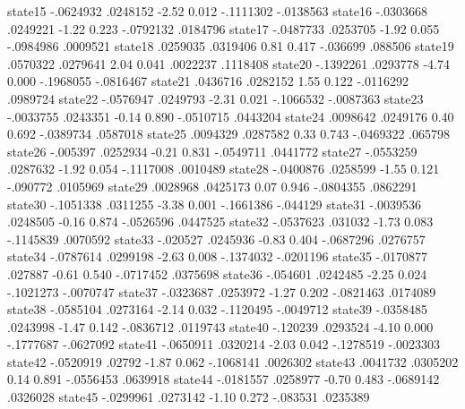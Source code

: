      state15 {\VBAR}  -.0624932   .0248152    -2.52   0.012    -.1111302   -.0138563
     state16 {\VBAR}  -.0303668   .0249221    -1.22   0.223    -.0792132    .0184796
     state17 {\VBAR}  -.0487733   .0253705    -1.92   0.055    -.0984986    .0009521
     state18 {\VBAR}   .0259035   .0319406     0.81   0.417     -.036699     .088506
     state19 {\VBAR}   .0570322   .0279641     2.04   0.041     .0022237    .1118408
     state20 {\VBAR}  -.1392261   .0293778    -4.74   0.000    -.1968055   -.0816467
     state21 {\VBAR}   .0436716   .0282152     1.55   0.122    -.0116292    .0989724
     state22 {\VBAR}  -.0576947   .0249793    -2.31   0.021    -.1066532   -.0087363
     state23 {\VBAR}  -.0033755   .0243351    -0.14   0.890    -.0510715    .0443204
     state24 {\VBAR}   .0098642   .0249176     0.40   0.692    -.0389734    .0587018
     state25 {\VBAR}   .0094329   .0287582     0.33   0.743    -.0469322     .065798
     state26 {\VBAR}   -.005397   .0252934    -0.21   0.831    -.0549711    .0441772
     state27 {\VBAR}  -.0553259   .0287632    -1.92   0.054    -.1117008    .0010489
     state28 {\VBAR}  -.0400876   .0258599    -1.55   0.121     -.090772    .0105969
     state29 {\VBAR}   .0028968   .0425173     0.07   0.946    -.0804355    .0862291
     state30 {\VBAR}  -.1051338   .0311255    -3.38   0.001    -.1661386    -.044129
     state31 {\VBAR}  -.0039536   .0248505    -0.16   0.874    -.0526596    .0447525
     state32 {\VBAR}  -.0537623    .031032    -1.73   0.083    -.1145839    .0070592
     state33 {\VBAR}   -.020527   .0245936    -0.83   0.404    -.0687296    .0276757
     state34 {\VBAR}  -.0787614   .0299198    -2.63   0.008    -.1374032   -.0201196
     state35 {\VBAR}  -.0170877    .027887    -0.61   0.540    -.0717452    .0375698
     state36 {\VBAR}   -.054601   .0242485    -2.25   0.024    -.1021273   -.0070747
     state37 {\VBAR}  -.0323687   .0253972    -1.27   0.202    -.0821463    .0174089
     state38 {\VBAR}  -.0585104   .0273164    -2.14   0.032    -.1120495   -.0049712
     state39 {\VBAR}  -.0358485   .0243998    -1.47   0.142    -.0836712    .0119743
     state40 {\VBAR}   -.120239   .0293524    -4.10   0.000    -.1777687   -.0627092
     state41 {\VBAR}  -.0650911   .0320214    -2.03   0.042    -.1278519   -.0023303
     state42 {\VBAR}  -.0520919     .02792    -1.87   0.062    -.1068141    .0026302
     state43 {\VBAR}   .0041732   .0305202     0.14   0.891    -.0556453    .0639918
     state44 {\VBAR}  -.0181557   .0258977    -0.70   0.483    -.0689142    .0326028
     state45 {\VBAR}  -.0299961   .0273142    -1.10   0.272     -.083531    .0235389
